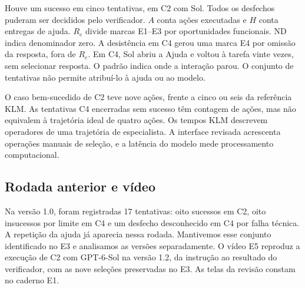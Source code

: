 Houve um sucesso em cinco tentativas, em C2 com Sol. Todos os desfechos puderam ser decididos pelo verificador. $A$ conta ações executadas e $H$ conta entregas de ajuda. $R_e$ divide marcas E1--E3 por oportunidades funcionais. ND indica denominador zero. A desistência em C4 gerou uma marca E4 por omissão da resposta, fora de $R_e$. Em C4, Sol abriu a Ajuda e voltou à tarefa vinte vezes, sem selecionar resposta. O padrão indica onde a interação parou. O conjunto de tentativas não permite atribuí-lo à ajuda ou ao modelo.

O caso bem-sucedido de C2 teve nove ações, frente a cinco ou seis da referência KLM. As tentativas C4 encerradas sem sucesso têm contagem de ações, mas não equivalem à trajetória ideal de quatro ações. Os tempos KLM descrevem operadores de uma trajetória de especialista. A interface revisada acrescenta operações manuais de seleção, e a latência do modelo mede processamento computacional.

\subsection{Rodada anterior e vídeo}
Na versão 1.0, foram registradas 17 tentativas: oito sucessos em C2, oito insucessos por limite em C4 e um desfecho desconhecido em C4 por falha técnica. A repetição da ajuda já aparecia nessa rodada. Mantivemos esse conjunto identificado no E3 e analisamos as versões separadamente. O vídeo E5 reproduz a execução de C2 com GPT-6-Sol na versão 1.2, da instrução ao resultado do verificador, com as nove seleções preservadas no E3. As telas da revisão constam no caderno E1.


